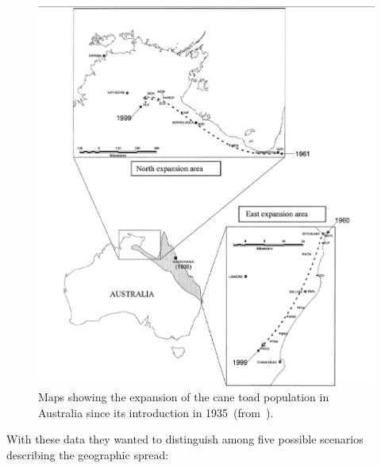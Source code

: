 \documentclass[12pt]{article}
\begin{document}
\begin{figure}
\begin{center}
\includegraphics[width=6.0in]{cane-toad-expansion.eps}
\end{center}
\caption{Maps showing the expansion of the cane toad population in
  Australia since its introduction in 1935~(from~\cite{Estoup-etal-2004}).}\label{fig:cane-toad-expansion}
\end{figure}

With these data they wanted to distinguish among five possible
scenarios describing the geographic spread:
\end{document}
